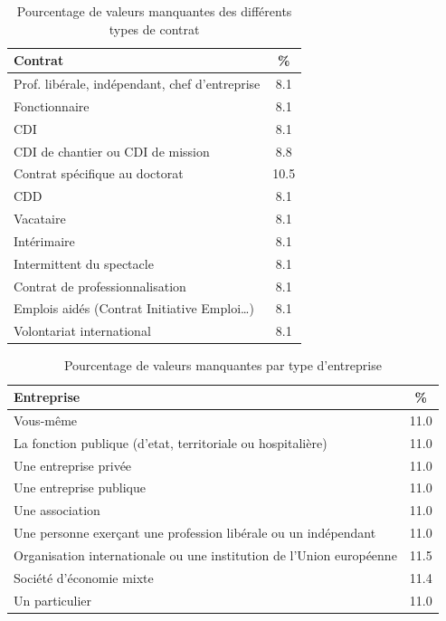 \documentclass[12pt, a4paper, titlepage, table]{article}
\begin{document}
\begin{table}[H]
	\centering
	\begin{tabularx}{\textwidth}{|X|c|}
		\hline
		\textbf{Contrat} & \textbf{\%} \\
		\hline
		Prof. libérale, indépendant, chef d’entreprise & 8.1 \\
		\hline
		Fonctionnaire & 8.1 \\
		\hline
		CDI & 8.1 \\
		\hline
		CDI de chantier ou CDI de mission & 8.8 \\
		\hline
		Contrat spécifique au doctorat & 10.5 \\
		\hline
		CDD & 8.1 \\
		\hline
		Vacataire & 8.1 \\
		\hline
		Intérimaire & 8.1 \\
		\hline
		Intermittent du spectacle & 8.1 \\
		\hline
		Contrat de professionnalisation & 8.1 \\
		\hline
		Emplois aidés (Contrat Initiative Emploi…) & 8.1 \\
		\hline
		Volontariat international & 8.1 \\
		\hline
	\end{tabularx}
	\caption{Pourcentage de valeurs manquantes des différents types de contrat}
	\label{tab:contrats_pourcentage}
\end{table}

\begin{table}[H]
	\centering
	\begin{tabularx}{\textwidth}{|X|c|}
		\hline
		\textbf{Entreprise} & \textbf{\%} \\
		\hline
		Vous-même & 11.0 \\
		\hline
		La fonction publique (d'etat, territoriale ou hospitalière) & 11.0 \\
		\hline
		Une entreprise privée & 11.0 \\
		\hline
		Une entreprise publique & 11.0 \\
		\hline
		Une association & 11.0 \\
		\hline
		Une personne exerçant une profession libérale ou un indépendant & 11.0 \\
		\hline
		Organisation internationale ou une institution de l'Union européenne & 11.5 \\
		\hline
		Société d'économie mixte & 11.4 \\
		\hline
		Un particulier & 11.0 \\
		\hline
	\end{tabularx}
	\caption{Pourcentage de valeurs manquantes par type d'entreprise}
	\label{tab:entreprise_pourcentage}
\end{table}
\end{document}
